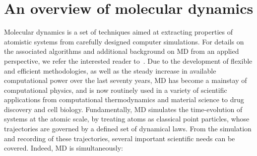 \section{An overview of molecular dynamics}
\label{sec:01:MD}
Molecular dynamics is a set of techniques aimed at extracting properties of atomistic systems from carefully designed computer simulations. For details on the associated algorithms and additional background on MD from an applied perspective, we refer the interested reader to~\cite{AT17,FS01,T10}.
Due to the development of flexible and efficient methodologies, as well as the steady increase in available computational power over the last seventy years, MD has become a mainstay of computational physics, and is now routinely used in a variety of scientific applications from computational thermodynamics and material science to drug discovery and cell biology.
Fundamentally, MD simulates the time-evolution of systems at the atomic scale, by treating atoms as classical point particles, whose trajectories are governed by a defined set of dynamical laws. From the simulation and recording of these trajectories, several important scientific needs can be covered. Indeed, MD is simultaneously:
